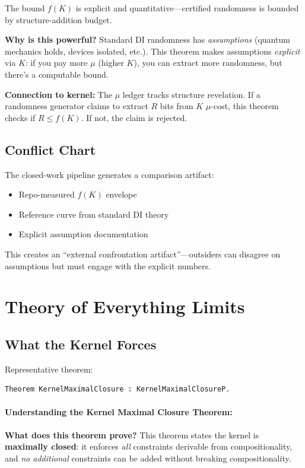 The bound $f(K)$ is explicit and quantitative---certified randomness is bounded by structure-addition budget.

\textbf{Why is this powerful?} Standard DI randomness has \textit{assumptions} (quantum mechanics holds, devices isolated, etc.). This theorem makes assumptions \textit{explicit} via $K$: if you pay more $\mu$ (higher $K$), you can extract more randomness, but there's a computable bound.

\textbf{Connection to kernel:} The $\mu$ ledger tracks structure revelation. If a randomness generator claims to extract $R$ bits from $K$ $\mu$-cost, this theorem checks if $R \leq f(K)$. If not, the claim is rejected.


\subsection{Conflict Chart}

The closed-work pipeline generates a comparison artifact:
\begin{itemize}
    \item Repo-measured $f(K)$ envelope
    \item Reference curve from standard DI theory
    \item Explicit assumption documentation
\end{itemize}

This creates an ``external confrontation artifact''---outsiders can disagree on assumptions but must engage with the explicit numbers.

\section{Theory of Everything Limits}

\subsection{What the Kernel Forces}

Representative theorem:
\begin{lstlisting}
Theorem KernelMaximalClosure : KernelMaximalClosureP.
\end{lstlisting}

\paragraph{Understanding the Kernel Maximal Closure Theorem:}

\textbf{What does this theorem prove?} This theorem states the kernel is \textbf{maximally closed}: it enforces \textit{all} constraints derivable from compositionality, and \textit{no additional} constraints can be added without breaking compositionality.


